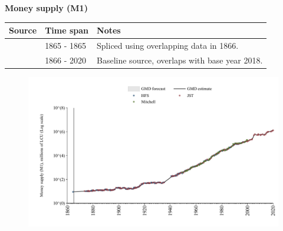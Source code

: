 \documentclass[12pt,a4paper,landscape]{article}
\begin{document}
\begin{adjustbox}{max totalsize={\paperwidth}{\paperheight},center}
\begin{minipage}[t][\textheight][t]{\textwidth}
\vspace*{0.5cm}
{}
\begin{center}
{\Large\bfseries Money supply (M1)}
\end{center}
\vspace{0.5cm}
\begin{table}[H]
\centering
\small
\begin{tabular}{|l|l|l|}
\hline
\textbf{Source} & \textbf{Time span} & \textbf{Notes} \\
\hline
\rowcolor{white}\cite{HFS}& 1865 - 1865 &Spliced using overlapping data in 1866. \\
\rowcolor{lightgray}\cite{JST}& 1866 - 2020 &Baseline source, overlaps with base year 2018. \\
\hline
\end{tabular}
\end{table}
\begin{figure}[H]
\centering
\includegraphics[width=\textwidth,height=0.6\textheight,keepaspectratio]{graphs/ESP_M1.pdf}
\end{figure}
\end{minipage}
\end{adjustbox}
\end{document}
